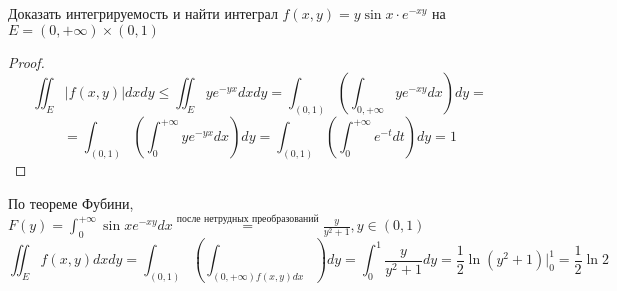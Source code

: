 \begin{example}
    Доказать интегрируемость и найти интеграл \(f(x, y) = y\sin x \cdot e^{-xy}\) на \(E = (0, +\infty) \times (0, 1)\)
\end{example}
\begin{proof}
    \[\iint_E |f(x, y)| dxdy \le \iint_E ye^{-yx}dxdy = \int_{(0, 1)}\left(\int_{0, +\infty}ye^{-xy}dx\right)dy =\]
    \[ = \int_{(0, 1)}\left(\int_0^{+\infty} ye^{-yx}dx\right)dy = \int_{(0, 1)}\left(\int_0^{+\infty} e^{-t}dt\right)dy = 1\]
\end{proof}

По теореме Фубини, \(F(y) = \int_0^{+\infty} \sin x e^{-xy}dx \stackrel{\text{после нетрудных преобразований}}{=}\frac{y}{y^2 + 1}, y \in (0, 1)\)
\[\iint_E f(x, y)dxdy = \int_{(0, 1)}\left(\int_{(0, +\infty) f(x, y)dx}\right)dy = \int_0^1 \frac{y}{y^2 + 1}dy = \frac{1}{2} \ln(y^2 + 1)|_0^1 = \frac{1}{2}\ln 2\]
